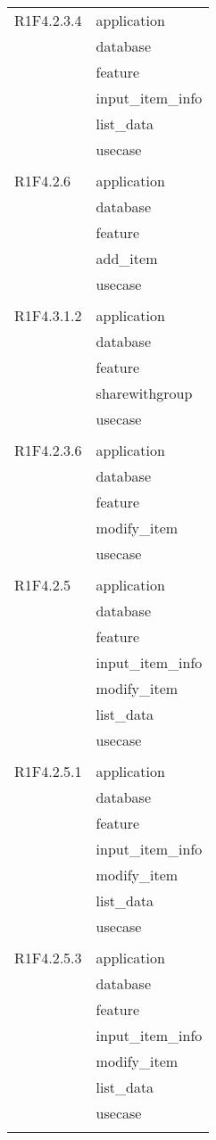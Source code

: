 \begin{center}
\begin{longtable}{|p{7cm}|p{7cm}|}
		R1F4.2.3.4 & application \\ & database \\ & feature \\ & input\_item\_info \\ & list\_data \\ & usecase \\ & \\ \hline
		R1F4.2.6 & application \\ & database \\ & feature \\ & add\_item \\ & usecase \\ & \\ \hline
		R1F4.3.1.2 & application \\ & database \\ & feature \\ & sharewithgroup \\ & usecase \\ & \\ \hline
		R1F4.2.3.6 & application \\ & database \\ & feature \\ & modify\_item \\ & usecase \\ & \\ \hline
		R1F4.2.5 & application \\ & database \\ & feature \\ & input\_item\_info \\ & modify\_item \\ & list\_data \\ & usecase \\ & \\ \hline
		R1F4.2.5.1 & application \\ & database \\ & feature \\ & input\_item\_info \\ & modify\_item \\ & list\_data \\ & usecase \\ & \\ \hline
		R1F4.2.5.3 & application \\ & database \\ & feature \\ & input\_item\_info \\ & modify\_item \\ & list\_data \\ & usecase \\ & \\ \hline

\end{longtable}
\end{center}
